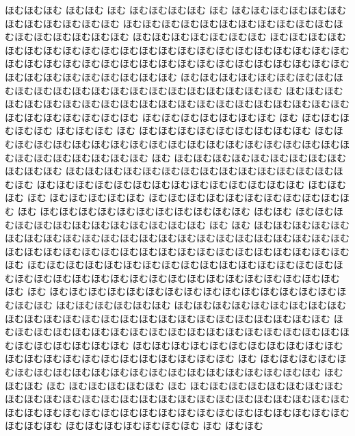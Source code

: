 \documentclass[a4paper]{article}
\begin{document}
\begin{prochomuhomu}{\NabeAzz}
ほむほむほむ ほむほむ ほむ ほむほむほむほむ ほむ
ほむほむほむほむほむほむ ほむほむほむほむほむほむ ほむほむほむほむほむほむほむほむほむほむほむほむほむほむほむほむほむほむ ほむほむほむほむほむほむほむ ほむほむほむほむほむほむほむほむほむほむほむほむほむほむほむほむほむほむほむほむほむほむ ほむほむほむほむほむほむほむほむほむほむほむほむほむほむほむほむほむほむほむほむほむほむほむほむほむほむほむ ほむほむほむほむほむほむほむほむほむほむほむほむほむほむほむほむほむほむほむほむほむほむほむ ほむほむほむほむほむほむほむほむほむほむほむほむほむほむほむほむほむほむほむほむほむほむほむほむほむほむほむほむ ほむほむほむほむほむほむほむ ほむ ほむほむほむほむほむ ほむほむほむ ほむ ほむほむほむほむほむほむほむほむほむ ほむほむほむほむほむほむほむほむほむほむほむほむほむほむほむほむほむほむほむほむほむほむほむほむほむほむほむ ほむ ほむほむほむほむほむほむほむほむほむほむほむほむ ほむほむほむほむほむほむほむほむほむほむほむほむほむほむほむほむ ほむほむほむほむほむほむほむほむほむほむほむほむほむほむ ほむほむ ほむ ほむ ほむほむほむほむほむ ほむほむほむほむほむほむほむほむほむほむほむ ほむ ほむほむほむほむほむほむほむほむほむほむほむ ほむほむ ほむほむほむほむほむほむほむほむほむほむほむほむほむ ほむ ほむ ほむほむほむほむほむほむほむほむほむほむほむほむほむほむほむほむほむほむほむほむほむほむほむほむほむほむほむほむほむほむほむほむほむほむほむほむほむほむほむほむほむほむ ほむほむほむほむほむほむほむほむほむほむほむほむほむほむほむほむほむほむほむほむほむほむほむほむほむほむほむほむほむほむほむほむほむほむ ほむ ほむ ほむほむほむほむほむほむほむほむほむほむほむほむほむほむほむほむほむほむ ほむほむほむほむほむほむ ほむほむほむほむほむほむほむほむほむほむほむほむほむほむほむほむほむほむほむほむほむほむほむほむほむほむ ほむほむほむほむほむほむほむほむほむほむほむほむほむほむほむほむほむほむほむほむほむほむほむほむほむ ほむほむほむほむほむほむほむほむほむほむほむほむほむほむほむほむほむほむほむほむほむほむほむ ほむ ほむほむほむほむほむほむほむほむほむほむほむほむほむほむほむほむほむほむほむほむほむ ほむほむほむ ほむ ほむほむほむほむほむ ほむ ほむほむほむほむほむほむほむほむほむほむほむほむほむほむほむほむほむほむほむほむほむほむほむほむほむほむほむほむほむほむほむほむほむほむほむほむほむほむほむほむほむほむほむほむほむほむほむ ほむほむほむほむほむほむほむ ほむ ほむほむ

\end{prochomuhomu}
\end{document}

